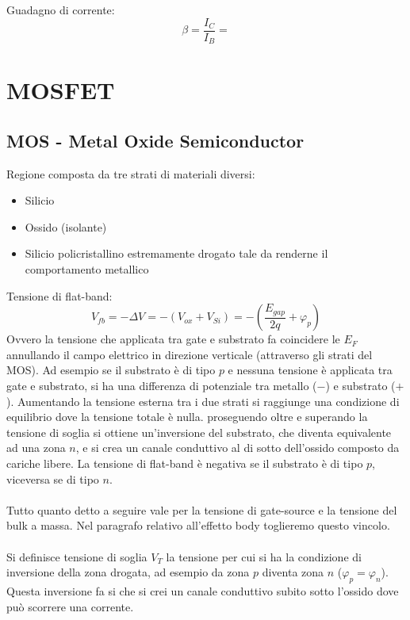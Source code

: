 \documentclass{article}
\begin{document}
Guadagno di corrente:
\begin{equation*}
\beta = \frac{I_C}{I_B} =
\end{equation*}
\section*{MOSFET}
\subsection*{MOS - Metal Oxide Semiconductor}
Regione composta da tre strati di materiali diversi:
\begin{itemize}
\item Silicio
\item Ossido (isolante)
\item Silicio policristallino estremamente drogato tale da renderne il comportamento metallico
\end{itemize}
Tensione di flat-band:
\begin{equation*}
V_{fb} = -\Delta V = -(V_{ox} +V_{Si}) = - \left( \frac{E_{gap}}{2q} + \varphi_p \right)
\end{equation*}
Ovvero la tensione che applicata tra gate e substrato fa coincidere le $E_F$ annullando il campo elettrico in direzione verticale (attraverso gli strati del MOS). Ad esempio se il substrato è di tipo $p$ e nessuna tensione è applicata tra gate e substrato, si ha una differenza di potenziale tra metallo ($-$) e substrato ($+$). Aumentando la tensione esterna tra i due strati si raggiunge una condizione di equilibrio dove la tensione totale è nulla. proseguendo oltre e superando la tensione di soglia si ottiene un'inversione del substrato, che diventa equivalente ad una zona $n$, e si crea un canale conduttivo al di sotto dell'ossido composto da cariche libere. La tensione di flat-band è negativa se il substrato è di tipo $p$, viceversa se di tipo $n$.\\
\\
Tutto quanto detto a seguire vale per la tensione di gate-source e la tensione del bulk a massa. Nel paragrafo relativo all'effetto body toglieremo questo vincolo.\\
\\
Si definisce tensione di soglia $V_T$ la tensione per cui si ha la condizione di inversione della zona drogata, ad esempio da zona $p$ diventa zona $n$ ($\varphi_p = \varphi_n$). Questa inversione fa si che si crei un canale conduttivo subito sotto l'ossido dove può scorrere una corrente.\\
\end{document}
